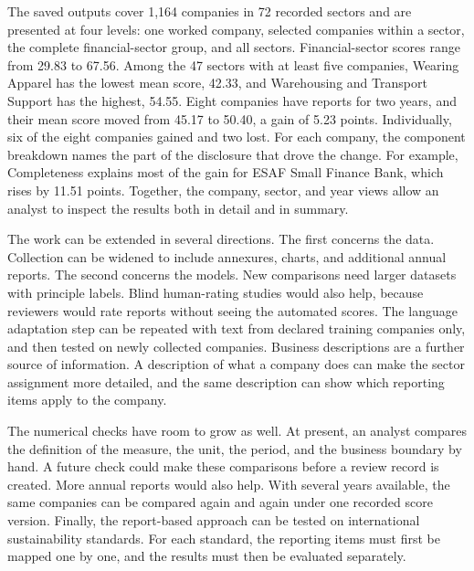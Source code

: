 The saved outputs cover 1,164 companies in 72 recorded sectors and are presented at four levels: one worked company, selected companies within a sector, the complete financial-sector group, and all sectors. Financial-sector scores range from 29.83 to 67.56. Among the 47 sectors with at least five companies, Wearing Apparel has the lowest mean score, 42.33, and Warehousing and Transport Support has the highest, 54.55. Eight companies have reports for two years, and their mean score moved from 45.17 to 50.40, a gain of 5.23 points. Individually, six of the eight companies gained and two lost. For each company, the component breakdown names the part of the disclosure that drove the change. For example, Completeness explains most of the gain for ESAF Small Finance Bank, which rises by 11.51 points. Together, the company, sector, and year views allow an analyst to inspect the results both in detail and in summary.

The work can be extended in several directions. The first concerns the data. Collection can be widened to include annexures, charts, and additional annual reports. The second concerns the models. New comparisons need larger datasets with principle labels. Blind human-rating studies would also help, because reviewers would rate reports without seeing the automated scores. The language adaptation step can be repeated with text from declared training companies only, and then tested on newly collected companies. Business descriptions are a further source of information. A description of what a company does can make the sector assignment more detailed, and the same description can show which reporting items apply to the company.

The numerical checks have room to grow as well. At present, an analyst compares the definition of the measure, the unit, the period, and the business boundary by hand. A future check could make these comparisons before a review record is created. More annual reports would also help. With several years available, the same companies can be compared again and again under one recorded score version. Finally, the report-based approach can be tested on international sustainability standards. For each standard, the reporting items must first be mapped one by one, and the results must then be evaluated separately.
